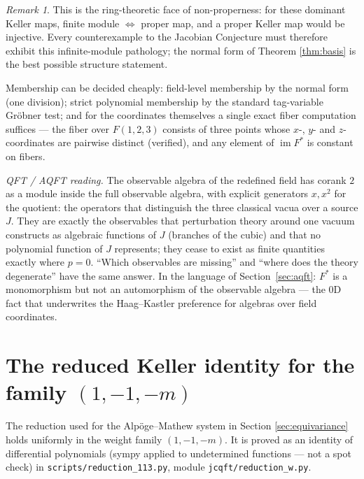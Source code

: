 \documentclass[11pt]{article}
\theoremstyle{definition}
\theoremstyle{remark}
\newtheorem{remark}[theorem]{Remark}
\newcommand{\im}{\operatorname{im}}
\begin{document}
\begin{remark}
This is the ring-theoretic face of non-properness: for these dominant
Keller maps, finite module $\Leftrightarrow$ proper map, and a proper
Keller map would be injective. Every counterexample to the Jacobian
Conjecture must therefore exhibit this infinite-module pathology; the
normal form of Theorem \ref{thm:basis} is the best possible structure
statement.
\end{remark}

Membership can be decided cheaply: field-level membership by the normal
form (one division); strict polynomial membership by the standard
tag-variable Gr\"obner test; and for the coordinates themselves a single
exact fiber computation suffices --- the fiber over $F(1,2,3)$ consists
of three points whose $x$-, $y$- and $z$-coordinates are pairwise
distinct (verified), and any element of $\im F^*$ is constant on fibers.

\emph{QFT / AQFT reading.} The observable algebra of the redefined
field has corank $2$ as a module inside the full observable algebra,
with explicit generators $x, x^2$ for the quotient: the operators that
distinguish the three classical vacua over a source $J$. They are
exactly the observables that perturbation theory around one vacuum
constructs as algebraic functions of $J$ (branches of the cubic) and
that no polynomial function of $J$ represents; they cease to exist as
finite quantities exactly where $p = 0$. ``Which observables are
missing'' and ``where does the theory degenerate'' have the same
answer. In the language of Section~\ref{sec:aqft}: $F^*$ is a
monomorphism but not an automorphism of the observable algebra --- the
0D fact that underwrites the Haag--Kastler preference for algebras
over field coordinates.

\section{The reduced Keller identity for the family
\texorpdfstring{$(1,-1,-m)$}{(1,-1,-m)}}
\label{sec:redw}

The reduction used for the Alp\"oge--Mathew system in Section
\ref{sec:equivariance} holds uniformly in the weight family
$(1,-1,-m)$. It is proved as an identity of differential polynomials
(sympy applied to undetermined functions --- not a spot check) in
\texttt{scripts/reduction\_113.py}, module \texttt{jcqft/reduction\_w.py}.
\end{document}
